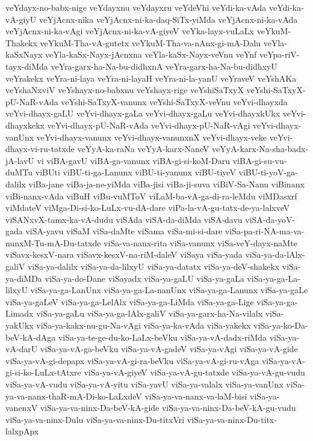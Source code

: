 {veYdayx-no-babx-nige
veYdayxnu
veYdayxru
veYdeVhi
veYdi-ka-vAda
veYdi-ka-vA-giyU
veYjAcnx-nika
veYjAcnx-ni-ka-daq-SiTx-yiMda
veYjAcnx-ni-ka-vAda
veYjAcnx-ni-ka-vAgi
veYjAcnx-ni-ka-vA-giyeV
veYka-layx-vuLaLx
veYkuM-Thakekx
veYkuM-Tha-vA-gutetx
veYkuM-Tha-va-nAnx-gi-mA-Dalu
veYla-kaSxNayx
veYla-kaSx-Nayx-jAcnxna
veYla-kaSx-Nayx-veVnu
veYnf
veYpa-riV-tayx-diMda
veYra-garx-ha-Na-bu-didhxnA
veYra-garx-ha-Na-bu-didhxyU
veYrakekx
veYra-ni-laya
veYra-ni-layaH
veYra-ni-la-yanU
veYraveV
veYshAKa
veYshaNxviV
veYshayx-no-babxnu
veYshayx-rige
veYshiSaTxyX
veYshi-SaTxyX-pU-NaR-vAda
veYshi-SaTxyX-vanunx
veYshi-SaTxyX-veVnu
veYvi-dhayxda
veYvi-dhayx-gaLU
veYvi-dhayx-gaLa
veYvi-dhayx-gaLu
veYvi-dhayxkUkx
veYvi-dhayxkekx
veYvi-dhayx-pU-NaR-vAda
veYvi-dhayx-pU-NaR-vAgi
veYvi-dhayx-vanUnx
veYvi-dhayx-vanunx
veYvi-dhayx-vanunxnX
veYvi-dhayx-veke
veYvi-dhayx-vi-ru-tatxde
veYyA-ka-raNa
veYyA-karx-NaneV
veYyA-karx-Na-sha-badx-jA-lavU
vi
viBA-gavU
viBA-ga-vanunx
viBA-gi-si-koM-Daru
viBA-gi-su-vu-duMTu
viBUti
viBU-ti-ga-Lanunx
viBU-ti-yanunx
viBU-tiyeV
viBU-ti-yoV-ga-dalilx
viBa-jane
viBa-ja-ne-yiMda
viBa-jisi
viBa-ji-suva
viBiV-Sa-Nanu
viBinanx
viBi-nanx-vAda
viBuH
viBu-vuMToV
viLaM-ba-vA-ga-di-ra-leMdu
viMDasxrf
viMdateV
viMga-Di-si-ko-LuLx-vu-dA-dare
viPa-la-vA-gu-tatx-de-ya-lalxveV
viSANxvX-tamx-ka-vA-dudu
viSAda
viSA-da-diMda
viSA-davu
viSA-da-yoV-gada
viSA-yavu
viSaM
viSa-daMte
viSama
viSa-mi-si-dare
viSa-pa-ri-NA-ma-va-nunxM-Tu-mA-Du-tatxde
viSa-va-nanx-rita
viSa-vanunx
viSa-veY-dayx-naMte
viSavx-kesxV-nara
viSavx-kesxV-na-riM-daleV
viSaya
viSa-yada
viSa-ya-da-lAlx-galiV
viSa-ya-dalilx
viSa-ya-da-lilxyU
viSa-ya-datatx
viSa-ya-deV-shakekx
viSa-ya-diMDa
viSa-ya-do-Dane
viSayadx
viSa-ya-gaLU
viSa-ya-gaLa
viSa-ya-ga-La-lilxyU
viSa-ya-ga-LanUnx
viSa-ya-ga-La-nanUnx
viSa-ya-ga-Lanunx
viSa-ya-gaLe
viSa-ya-gaLeV
viSa-ya-ga-LelAlx
viSa-ya-ga-LiMda
viSa-ya-ga-Lige
viSa-ya-ga-Limadx
viSa-ya-gaLu
viSa-ya-ga-lAlx-galiV
viSa-ya-garx-ha-Na-vilalx
viSa-yakUkx
viSa-ya-kakx-nu-gu-Na-vAgi
viSa-ya-ka-vAda
viSa-yakekx
viSa-ya-ko-Da-beV-kA-dAga
viSa-ya-te-ge-du-ko-LaLx-beVku
viSa-ya-vA-dadx-riMda
viSa-ya-vA-darU
viSa-ya-vA-ga-beVku
viSa-ya-vA-gadeV
viSa-ya-vAgi
viSa-ya-vA-gide
viSa-ya-vA-gi-depapx
viSa-ya-vA-gi-ra-beVku
viSa-ya-vA-gi-ru-vAga
viSa-ya-vA-gi-si-ko-LuLx-tAtxre
viSa-ya-vA-giyeV
viSa-ya-vA-gu-tatxde
viSa-ya-vA-gu-vudu
viSa-ya-vA-vudu
viSa-ya-vA-yitu
viSa-yavU
viSa-ya-valalx
viSa-ya-vanUnx
viSa-ya-va-nanx-thaR-mA-Di-ko-LaLxdeV
viSa-ya-va-nanx-va-laM-bisi
viSa-ya-vanenxV
viSa-ya-va-ninx-Da-beV-kA-gide
viSa-ya-va-ninx-Da-beV-kA-gu-vudu
viSa-ya-va-ninx-Dulu
viSa-ya-va-ninx-Du-titxVri
viSa-ya-va-ninx-Du-titx-lalxpApx
}
